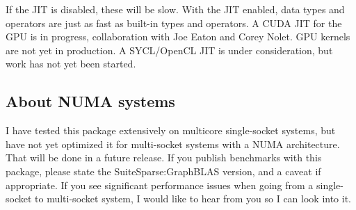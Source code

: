 If the JIT is disabled, these will be slow.  With the JIT enabled, data types
and operators are just as fast as built-in types and operators.  A CUDA JIT for
the GPU is in progress, collaboration with Joe Eaton and Corey Nolet.
GPU kernels are not yet in production.
A SYCL/OpenCL JIT is under consideration, but work has not yet been started.

\subsection{About NUMA systems}

I have tested this package extensively on multicore single-socket systems, but
have not yet optimized it for multi-socket systems with a NUMA architecture.
That will be done in a future release.  If you publish benchmarks
with this package, please state the SuiteSparse:GraphBLAS version, and a caveat
if appropriate.  If you see significant performance issues when going from a
single-socket to multi-socket system, I would like to hear from you so I can
look into it.

